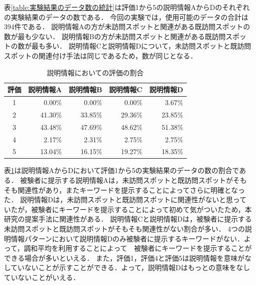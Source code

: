 \documentclass{deimj}
\begin{document}
表\ref{table:実験結果のデータ数の統計}は評価1から5の説明情報AからDのそれぞれの実験結果のデータの数である．
今回の実験では，使用可能のデータの合計は394件である．
説明情報Aの方が未訪問スポットと関連がある既訪問スポットの数が最も少ない．
説明情報Bの方が未訪問スポットと関連がある既訪問スポットの数が最も多い．
説明情報Cと説明情報Dについて，未訪問スポットと既訪問スポットの関連付け手法は同じであるため，数が同じとなる．

\begin{table}[t]
  \caption{説明情報においての評価の割合}
  \label{table:説明情報においての評価の割合}
  \centering
  \begin{tabular}{c|r|r|r|r}
  \hline
  評価 & \multicolumn{1}{c|}{説明情報A} & \multicolumn{1}{c|}{説明情報B} & \multicolumn{1}{c|}{説明情報C} & \multicolumn{1}{c}{説明情報D} \\ \hline
  1  & 0.00\%                     & 0.00\%                     & 0.00\%                     & 3.67\%                    \\ \hline
  2  & 41.30\%                    & 33.85\%                    & 29.36\%                    & 23.85\%                   \\ \hline
  3  & 43.48\%                    & 47.69\%                    & 48.62\%                    & 51.38\%                   \\ \hline
  4  & 2.17\%                     & 2.31\%                     & 2.75\%                     & 2.75\%                    \\ \hline
  5  & 13.04\%                    & 16.15\%                    & 19.27\%                    & 18.35\%                   \\ \hline
  \end{tabular}
\end{table}

表\ref{table:説明情報においての評価の割合}は説明情報AからDにおいて評価1から5の実験結果のデータの数の割合である．
被験者に提示する説明情報Aは，未訪問スポットと既訪問スポットがそもそも関連性があり，またキーワードを提示することによってさらに明確となった．
説明情報Dは，未訪問スポットと既訪問スポットに関連性がないと思っていたが，被験者にキーワードを提示することによって初めて気がついたため，本研究の提案手法に関連性がある．
説明情報Cと説明情報Dは，被験者に提示する未訪問スポットと既訪問スポットがそもそも関連性がない割合が多い．
4つの説明情報パターンにおいて説明情報Dのみ被験者に提示するキーワードがない．よって，調和平均を利用することによって　被験者にキーワードを提示することができる場合が多いといえる．
また，評価1，評価4と評価5は説明情報を意味がなしていないことが示すことができる．よって，説明情報Dはもっとの意味をなしていないことがいえる．
\end{document}
